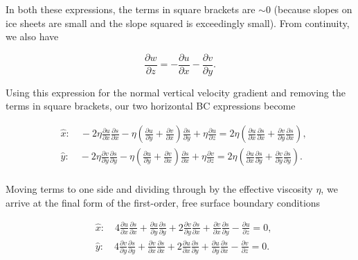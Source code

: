 In both these expressions, the terms in square brackets are $\sim{0}$ (because slopes on ice sheets are small and the slope squared is exceedingly small). From continuity, we also have

\begin{equation}
\frac{\partial w}{\partial z}=-\frac{\partial u}{\partial x}-\frac{\partial v}{\partial y}.
\end{equation}

\noindent
Using this expression for the normal vertical velocity gradient and removing the terms in square brackets, our two horizontal BC expressions become

\begin{equation}
\begin{split}
   {} & \hat{x}:\quad -2\eta \frac{\partial u}{\partial x}\frac{\partial s}{\partial x}-\eta \left( \frac{\partial u}{\partial y}+\frac{\partial v}{\partial x} \right)\frac{\partial s}{\partial y}+\eta \frac{\partial u}{\partial z}=2\eta \left( \frac{\partial u}{\partial x}\frac{\partial s}{\partial x}+\frac{\partial v}{\partial y}\frac{\partial s}{\partial x} \right),  \\
   {} & \hat{y}:\quad -2\eta \frac{\partial v}{\partial y}\frac{\partial s}{\partial y}-\eta \left( \frac{\partial u}{\partial y}+\frac{\partial v}{\partial x} \right)\frac{\partial s}{\partial x}+\eta \frac{\partial v}{\partial z}=2\eta \left( \frac{\partial u}{\partial x}\frac{\partial s}{\partial y}+\frac{\partial v}{\partial y}\frac{\partial s}{\partial y} \right).  \\
\end{split}
\end{equation}

\noindent 
Moving terms to one side and dividing through by the effective viscosity \textit{\(\eta{}\)}, we arrive at the final form of the first-order, free surface boundary conditions

\begin{equation}
\begin{split}
   {} & \hat{x}:\quad 4\frac{\partial u}{\partial x}\frac{\partial s}{\partial x}+\frac{\partial u}{\partial y}\frac{\partial s}{\partial y}+2\frac{\partial v}{\partial y}\frac{\partial s}{\partial x}+\frac{\partial v}{\partial x}\frac{\partial s}{\partial y}-\frac{\partial u}{\partial z}=0,  \\
   {} & \hat{y}:\quad 4\frac{\partial v}{\partial y}\frac{\partial s}{\partial y}+\frac{\partial v}{\partial x}\frac{\partial s}{\partial x}+2\frac{\partial u}{\partial x}\frac{\partial s}{\partial y}+\frac{\partial u}{\partial y}\frac{\partial s}{\partial x}-\frac{\partial v}{\partial z}=0.  \\
\end{split}
\end{equation}


